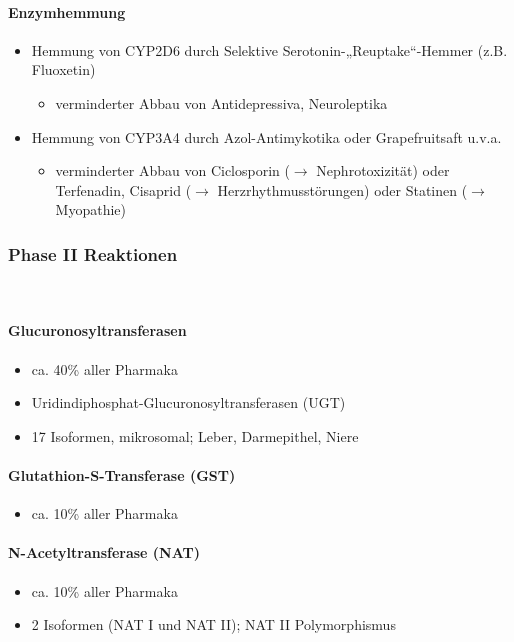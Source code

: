 \documentclass[10pt,a4paper]{report}
\begin{document}
\paragraph{Enzymhemmung}
\begin{itemize}
	\item Hemmung von CYP2D6 durch Selektive Serotonin-„Reuptake“-Hemmer (z.B. Fluoxetin)
	\begin{itemize}
	\renewcommand{\labelitemi}{$\rightarrow$}
	\item verminderter	 Abbau von Antidepressiva, Neuroleptika
	\end{itemize}
	\item Hemmung von CYP3A4 durch Azol-Antimykotika oder Grapefruitsaft u.v.a.
	\begin{itemize}
		\renewcommand{\labelitemi}{$\rightarrow$}
		\item verminderter Abbau von Ciclosporin ($\rightarrow$ Nephrotoxizität) 
	     oder Terfenadin, Cisaprid ($\rightarrow$ Herzrhythmusstörungen) oder Statinen ($\rightarrow$ Myopathie)
	\end{itemize}
\end{itemize}
\subsubsection{Phase II Reaktionen} \mbox{}\\
\paragraph{Glucuronosyltransferasen}
\begin{itemize}
	\item ca. 40\% aller Pharmaka
	\item Uridindiphosphat-Glucuronosyltransferasen (UGT)
	\item 17 Isoformen, mikrosomal; Leber, Darmepithel, Niere
\end{itemize}
\paragraph{Glutathion-S-Transferase (GST)}
\begin{itemize}
	\item ca. 10\% aller Pharmaka
\end{itemize}
\paragraph{N-Acetyltransferase (NAT) }
\begin{itemize}
	\item ca. 10\% aller Pharmaka
	\item 2 Isoformen (NAT I und NAT II); NAT II Polymorphismus
\end{itemize}
\end{document}
